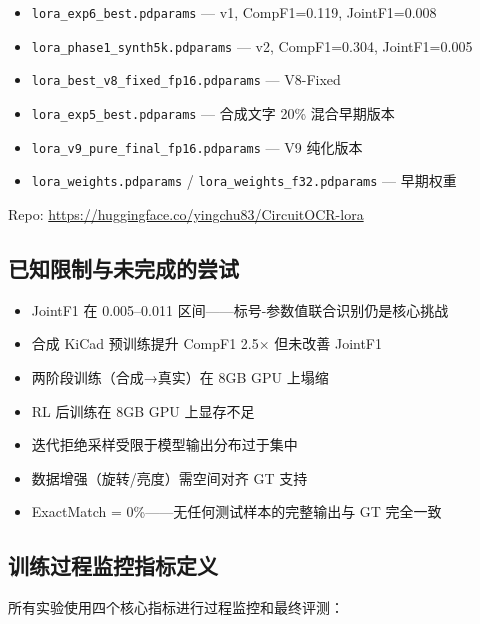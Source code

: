 \begin{itemize}[nosep]
    \item \texttt{lora\_exp6\_best.pdparams} — v1, CompF1=0.119, JointF1=0.008
    \item \texttt{lora\_phase1\_synth5k.pdparams} — v2, CompF1=0.304, JointF1=0.005
    \item \texttt{lora\_best\_v8\_fixed\_fp16.pdparams} — V8-Fixed
    \item \texttt{lora\_exp5\_best.pdparams} — 合成文字 20\% 混合早期版本
    \item \texttt{lora\_v9\_pure\_final\_fp16.pdparams} — V9 纯化版本
    \item \texttt{lora\_weights.pdparams} / \texttt{lora\_weights\_f32.pdparams} — 早期权重
\end{itemize}

Repo: \url{https://huggingface.co/yingchu83/CircuitOCR-lora}

\subsection{已知限制与未完成的尝试}

\begin{itemize}[nosep]
    \item JointF1 在 0.005--0.011 区间——标号-参数值联合识别仍是核心挑战
    \item 合成 KiCad 预训练提升 CompF1 2.5$\times$ 但未改善 JointF1
    \item 两阶段训练（合成→真实）在 8GB GPU 上塌缩
    \item RL 后训练在 8GB GPU 上显存不足
    \item 迭代拒绝采样受限于模型输出分布过于集中
    \item 数据增强（旋转/亮度）需空间对齐 GT 支持
    \item ExactMatch = 0\%——无任何测试样本的完整输出与 GT 完全一致
\end{itemize}

\subsection{训练过程监控指标定义}

所有实验使用四个核心指标进行过程监控和最终评测：

